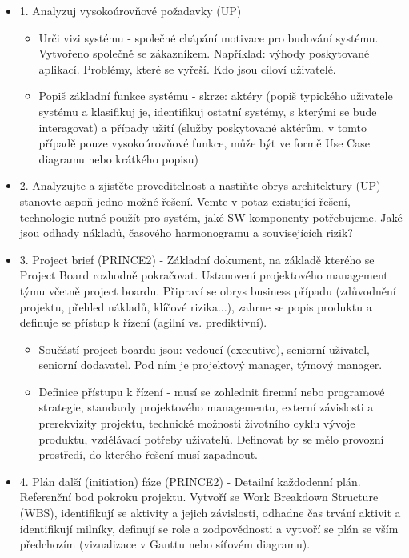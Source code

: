 \documentclass[11pt,a4paper]{article}
\begin{document}
        \begin{itemize}
            \item 1. Analyzuj vysokoúrovňové požadavky (UP)
            \begin{itemize}
                \item Urči vizi systému - společné chápání motivace pro budování systému. Vytvořeno společně se zákazníkem. Například: výhody poskytované aplikací. Problémy, které se vyřeší. Kdo jsou cíloví uživatelé.
                \item Popiš základní funkce systému - skrze: aktéry (popiš typického uživatele systému a klasifikuj je, identifikuj ostatní systémy, s kterými se bude interagovat) a případy užití (služby poskytované aktérům, v tomto případě pouze vysokoúrovňové funkce, může být ve formě Use Case diagramu nebo krátkého popisu)
            \end{itemize}
            \item 2. Analyzujte a zjistěte proveditelnost a nastiňte obrys architektury (UP) - stanovte aspoň jedno možné řešení. Vemte v potaz existující řešení, technologie nutné použít pro systém, jaké SW komponenty potřebujeme. Jaké jsou odhady nákladů, časového harmonogramu a souvisejících rizik?
            \item 3. Project brief (PRINCE2) - Základní dokument, na základě kterého se Project Board rozhodně pokračovat. Ustanovení projektového management týmu včetně project boardu. Připraví se obrys business případu (zdůvodnění projektu, přehled nákladů, klíčové rizika...), zahrne se popis produktu a definuje se přístup k řízení (agilní vs. prediktivní).
            \begin{itemize}
                \item Součástí project boardu jsou: vedoucí (executive), seniorní uživatel, seniorní dodavatel. Pod ním je projektový manager, týmový manager.
                \item Definice přístupu k řízení - musí se zohlednit firemní nebo programové strategie, standardy projektového managementu, externí závislosti a prerekvizity projektu, technické možnosti životního cyklu vývoje produktu, vzdělávací potřeby uživatelů. Definovat by se mělo provozní prostředí, do kterého řešení musí zapadnout.
            \end{itemize}
            \item 4. Plán další (initiation) fáze (PRINCE2) - Detailní každodenní plán. Referenční bod pokroku projektu. Vytvoří se Work Breakdown Structure (WBS), identifikují se aktivity a jejich závislosti, odhadne čas trvání aktivit a identifikují milníky, definují se role a zodpovědnosti a vytvoří se plán se vším předchozím (vizualizace v Ganttu nebo síťovém diagramu).
        \end{itemize}
\end{document}
